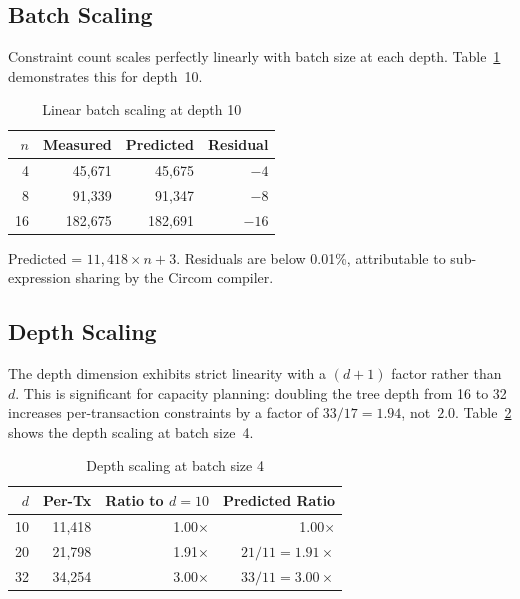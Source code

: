 \subsection{Batch Scaling}

Constraint count scales perfectly linearly with batch size at each
depth. Table~\ref{tab:batch-scaling} demonstrates this for depth~10.

\begin{table}[htbp]
\centering
\caption{Linear batch scaling at depth 10}
\label{tab:batch-scaling}
\begin{tabular}{@{}rrrr@{}}
\toprule
$n$ & Measured & Predicted & Residual \\
\midrule
 4 &  45,671 &  45,675 & $-4$ \\
 8 &  91,339 &  91,347 & $-8$ \\
16 & 182,675 & 182,691 & $-16$ \\
\bottomrule
\end{tabular}
\par\vspace{1mm}
\parbox{\columnwidth}{\footnotesize Predicted = $11{,}418 \times n + 3$. Residuals are below
0.01\%, attributable to sub-expression sharing by the Circom compiler.}
\end{table}
\FloatBarrier

\subsection{Depth Scaling}

The depth dimension exhibits strict linearity with a $(d+1)$ factor
rather than~$d$. This is significant for capacity planning:
doubling the tree depth from 16 to 32 increases per-transaction
constraints by a factor of $33/17 = 1.94$, not~$2.0$.
Table~\ref{tab:depth-scaling} shows the depth scaling at batch size~4.

\begin{table}[htbp]
\centering
\caption{Depth scaling at batch size 4}
\label{tab:depth-scaling}
\begin{tabular}{@{}rrrr@{}}
\toprule
$d$ & Per-Tx & Ratio to $d{=}10$ & Predicted Ratio \\
\midrule
10 & 11,418 & 1.00$\times$ & 1.00$\times$ \\
20 & 21,798 & 1.91$\times$ & $21/11 = 1.91\times$ \\
32 & 34,254 & 3.00$\times$ & $33/11 = 3.00\times$ \\
\bottomrule
\end{tabular}
\end{table}
\FloatBarrier

